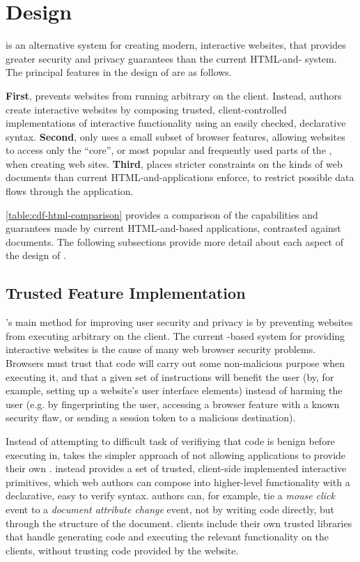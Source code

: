 \section{Design}
\label{future-web:design}

\CDF is an alternative system for creating modern, interactive websites, that
provides greater security and privacy guarantees than the current HTML-and-\JS
system.  The principal features in the design of \CDF are as follows.

\textbf{First}, \CDF prevents websites from running arbitrary \JS on the
client.  Instead, \CDF authors create interactive websites by composing
trusted, client-controlled implementations of interactive functionality using
an easily checked, declarative syntax.  \textbf{Second}, \CDF only uses a small
subset of browser features, allowing websites to access only the ``core'', or
most popular and frequently used parts of the \WAPI, when creating web sites.
\textbf{Third}, \CDF places stricter constraints on the kinds of web documents
than current HTML-and-\JS applications enforce, to restrict possible data
flows through the application.



\ref{table:cdf-html-comparison} provides a comparison of the capabilities
and guarantees made by current HTML-and-\JS based applications, contrasted
against \CDF documents.  The following subsections provide more detail
about each aspect of the design of \CDF.


\subsection{Trusted Feature Implementation}
\label{future-web:design:trusted-feature-implementation}
\CDF's main method for improving user security and privacy is by preventing
websites from executing arbitrary \JS on the client.  The current \JS-based
system for providing interactive websites is the cause of many web browser
security problems.  Browsers must trust that code will carry out some
non-malicious purpose when executing it, and that a given set of \JS
instructions will benefit the user (by, for example, setting up a website's
user interface elements) instead of harming the user (e.g. by fingerprinting
the user, accessing a browser feature with a known security flaw, or sending a
session token to a malicious destination).

Instead of attempting to difficult task of verifiying that \JS code is benign
before executing in, \CDF takes the simpler approach of not allowing
applications to provide their own \JS.  \CDF instead provides a set of trusted,
client-side implemented interactive primitives, which web authors can compose
into higher-level functionality with a declarative, easy to verify syntax.
\CDF authors can, for example, tie a \emph{mouse click} event to a
\emph{document attribute change} event, not by writing code directly, but
through the structure of the document.  \CDF clients include their own trusted
libraries that handle generating code and executing the relevant functionality
on the clients, without trusting code provided by the website.

